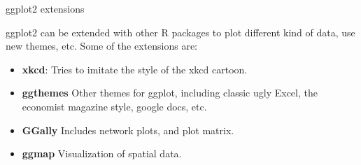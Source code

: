 \documentclass{beamer}\usepackage[]{graphicx}\usepackage[]{color}
\begin{document}
\begin{frame}[containsverbatim]{ggplot2 extensions}

ggplot2 can be extended with other R packages to plot different kind of data, use new themes, etc. Some of the extensions are:
\begin{itemize}
\item \textbf{xkcd}: Tries to imitate the style of the xkcd cartoon.
\item \textbf{ggthemes} Other themes for ggplot, including classic ugly Excel, the economist magazine style, google docs, etc.
\item \textbf{GGally} Includes network plots, and plot matrix.
\item \textbf{ggmap} Visualization of spatial data.
\end{itemize}
\end{frame}
\end{document}
